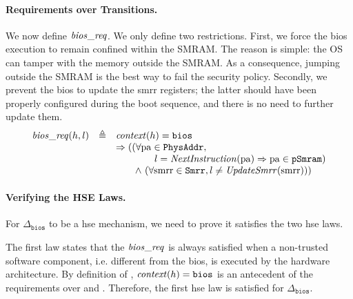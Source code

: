 
\paragraph{Requirements over Transitions.}
%
We now define $\mathit{bios\_req}$.
%
We only define two restrictions.
%
First, we force the \ac{bios} execution to remain confined within the SMRAM.
%
The reason is simple: the OS can tamper with the memory outside the SMRAM.
%
As a consequence, jumping outside the SMRAM is the best way to fail the security
policy.
%
Secondly, we prevent the \ac{bios} to update the \ac{smrr} registers;
%
the latter should have been properly configured during the boot sequence, and
there is no need to further update them.
%
\[
  \begin{array}{rcl}
    \func{bios\_req}(h, l)
    & \triangleq
    & \func{context}(h) = \val{bios} \\
    & %
    & \Rightarrow ((\forall \var{pa} \in \texttt{PhysAddr}, \\
    & %
    & \qquad\qquad l = \func{NextInstruction}(\var{pa})
      \Rightarrow \var{pa} \in \texttt{pSmram}) \\
    & %
    & \qquad\wedge~(\forall \var{smrr} \in \texttt{Smrr}, l \neq \func{UpdateSmrr}(\var{smrr})))
  \end{array}
\]

\paragraph{Verifying the HSE Laws.}
%
For $\Delta_{\mathtt{bios}}$ to be a \ac{hse} mechanism, we need to prove it
satisfies the two \ac{hse} laws.

The first law states that the \( \mathit{bios\_req} \) is always satisfied when a
non-trusted software component, i.e. different from the \ac{bios}, is executed
by the hardware architecture.
%
By definition of , \( \mathit{context}(h) = \mathtt{bios} \) is an
antecedent of the requirements over  and
.
%
Therefore, the first \ac{hse} law is satisfied for \( \Delta_{\mathtt{bios}} \).


